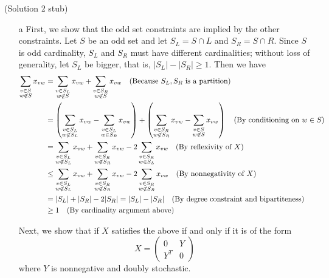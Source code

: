 \documentclass{hmcpset}
\begin{document}
\begin{solution}
(Solution 2 stub)
\begin{enumerate}
\item[a] 
First, we show that the odd set constraints are implied by the other constraints. Let $S$ be an odd set and let $S_L = S \cap L$ and $S_R = S \cap R$. Since $S$ is odd cardinality, $S_L$ and $S_R$ must have different cardinalities; without loss of generality, let $S_L$ be bigger, that is, $|S_L| - |S_R| \geq 1$. Then we have
\begin{align*}
\sum_{\substack{v \in S \\ w \not \in S}} x_{vw} &= \sum_{\substack{v \in S_L \\ w \not \in S}} x_{vw} + \sum_{\substack{v \in S_R \\ w \not \in S}} x_{vw} \text{\quad(Because $S_L,S_R$ is a partition)} \\
&= \left (\sum_{\substack{v \in S_L \\ w \not \in S_L}} x_{vw} - \sum_{\substack{v \in S_L \\ w \in S_R}} x_{vw}\right ) + \left (\sum_{\substack{v \in S_R \\ w \not \in S_R}} x_{vw} - \sum_{\substack{v \in S \\ w \not \in S}} x_{vw}\right ) \text{\quad (By conditioning on $w\in S$)} \\
&= \sum_{\substack{v \in S_L \\ w \not \in S_L}} x_{vw} + \sum_{\substack{v \in S_R \\ w \not \in S_R}} x_{vw} - 2\sum_{\substack{v \in S_R \\ w \in S_L}} x_{vw} \text{\quad (By reflexivity of $X$)}\\
&\leq \sum_{\substack{v \in S_L \\ w \not \in S_L}} x_{vw} + \sum_{\substack{v \in S_R \\ w \not \in S_R}} x_{vw} - 2\sum_{\substack{v \in S_R \\ w \not \in S_R}} x_{vw} \text {\quad (By nonnegativity of $X$)}\\
& = |S_L| + |S_R| - 2|S_R| = |S_L|-|S_R| \text{\quad (By degree constraint and bipartiteness)}\\
& \geq 1 \text {\quad (By cardinality argument above)}
\end{align*}

Next, we show that if $X$ satisfies the above if and only if it is of the form 
\[ X = \begin{pmatrix} 0 & Y \\ Y^T & 0\end{pmatrix} \]
where $Y$ is nonnegative and doubly stochastic.


\end{enumerate}
\end{solution}
\end{document}
